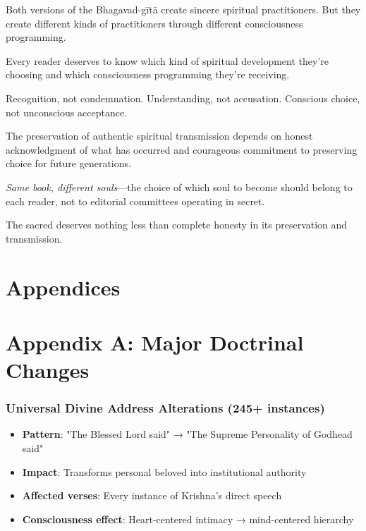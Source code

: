 \documentclass[11pt,twoside]{book}
\begin{document}
Both versions of the Bhagavad-gītā create sincere spiritual practitioners. But they create different kinds of practitioners through different consciousness programming.

Every reader deserves to know which kind of spiritual development they're choosing and which consciousness programming they're receiving.

Recognition, not condemnation. Understanding, not accusation. Conscious choice, not unconscious acceptance.

The preservation of authentic spiritual transmission depends on honest acknowledgment of what has occurred and courageous commitment to preserving choice for future generations.

\textit{Same book, different souls}—the choice of which soul to become should belong to each reader, not to editorial committees operating in secret.

The sacred deserves nothing less than complete honesty in its preservation and transmission.
\part*{Appendices}
\label{sec:org968b83b}
\thispagestyle{plain}
\part*{Appendix A: Major Doctrinal Changes}
\label{sec:orgcb8e146}
\thispagestyle{plain}
\section*{Universal Divine Address Alterations (245+ instances)}
\label{sec:org121d3bb}
\begin{itemize}
\item \textbf{\textbf{Pattern}}: "The Blessed Lord said" → "The Supreme Personality of Godhead said"
\item \textbf{\textbf{Impact}}: Transforms personal beloved into institutional authority
\item \textbf{\textbf{Affected verses}}: Every instance of Krishna's direct speech
\item \textbf{\textbf{Consciousness effect}}: Heart-centered intimacy → mind-centered hierarchy
\end{itemize}
\end{document}
